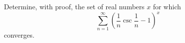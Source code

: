 Determine, with proof, the set of real numbers $x$ for which
\[
\sum_{n=1}^\infty \left( \frac{1}{n} \csc \frac{1}{n} - 1 \right)^x
\]
converges.
